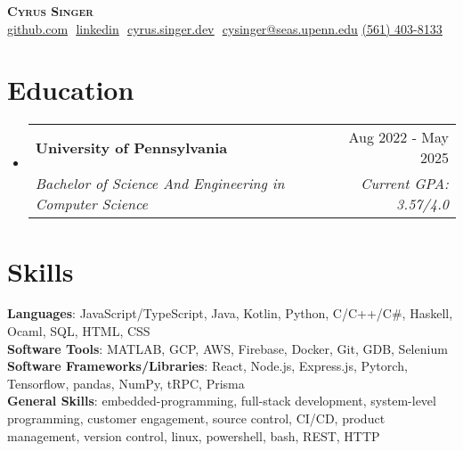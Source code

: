 \documentclass[letterpaper,11pt]{article}
\makeatletter
\newcommand{\resumeSubheading}[4]{
  \vspace{-2pt}\item
    \begin{tabular*}{0.97\textwidth}[t]{l@{\extracolsep{\fill}}r}
      \textbf{#1} & #2 \\
      \textit{\small#3} & \textit{\small #4} \\
    \end{tabular*}\vspace{-7pt}
}
\newcommand{\resumeSubHeadingListStart}{\begin{itemize}[leftmargin=0.15in, label={}]}
\newcommand{\resumeSubHeadingListEnd}{\end{itemize}}
\makeatother
\begin{document}
\hfill

\begin{center}
    \textbf{\Huge \scshape Cyrus Singer} \\ \vspace{8pt}
    \small 
    \href{https://github.com/brianbob12}{\underline{github.com}} $  $
    \href{https://www.linkedin.com/in/cyrus-singer-35b4a5221}{\underline{linkedin}} $  $
    \href{https://cyrus.singer.dev}{\underline{cyrus.singer.dev}} $ $
    \href{mailto:cysinger@seas.upenn.edu}
    {\underline{cysinger@seas.upenn.edu}}
    \href{tel:561-403-8133}{\underline{(561) 403-8133}}
\end{center}

\section{ Education}
  \resumeSubHeadingListStart
  
    \resumeSubheading
      {University of Pennsylvania}{Aug 2022 - May 2025}
      {Bachelor of Science And Engineering in Computer Science}{Current GPA: 3.57/4.0}
      \vspace{3pt}

      
      
  \resumeSubHeadingListEnd

  \section{ Skills}
  \begin{itemize}[leftmargin=0.15in, label={}]
      \small{\item{
      
      \textbf{Languages}{: JavaScript/TypeScript, Java, Kotlin, Python, C/C++/C\#, Haskell, Ocaml, SQL, HTML, CSS} \\
      
      \textbf{Software Tools}{: MATLAB, GCP, AWS, Firebase, Docker, Git, GDB, Selenium}\\

      \textbf{Software Frameworks/Libraries}{: React, Node.js, Express.js, Pytorch, Tensorflow, pandas, NumPy, tRPC, Prisma} \\

      \textbf{General Skills}{: embedded-programming, full-stack development, system-level programming, customer engagement, source control, CI/CD, product management, version control, linux, powershell, bash, REST, HTTP}
      }}
  \end{itemize}
\end{document}
